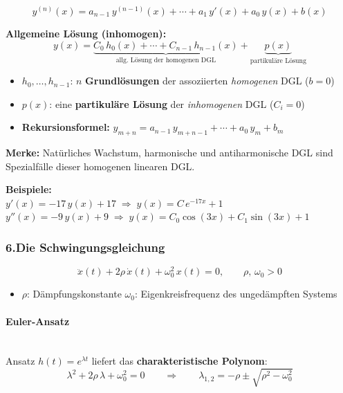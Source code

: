 \documentclass[../../zusammenfassung_AN.tex]{subfiles}
\begin{document}
	\[
	y^{(n)}(x) = a_{n-1}\,y^{(n-1)}(x) + \cdots + a_1\,y'(x) + a_0\,y(x) + b(x)
	\]
	
	\begin{tcolorbox}[formelbox]
		\textbf{Allgemeine Lösung (inhomogen):}
		\[
		\boxed{y(x) = \underbrace{C_0\,h_0(x) + \cdots + C_{n-1}\,h_{n-1}(x)}_{\text{allg.\ Lösung der homogenen DGL}} + \underbrace{p(x)}_{\text{partikuläre Lösung}}}
		\]
	\end{tcolorbox}
	
	\begin{itemize}[noitemsep, topsep=2pt]
		\item $h_0,\dots,h_{n-1}$: $n$ \textbf{Grundlösungen} der assoziierten \emph{homogenen} DGL ($b=0$)
		\item $p(x)$: eine \textbf{partikuläre Lösung} der \emph{inhomogenen} DGL ($C_i=0$)
		\item \textbf{Rekursionsformel:} $y_{m+n} = a_{n-1}\,y_{m+n-1} + \cdots + a_0\,y_m + b_m$
	\end{itemize}
	
	\begin{tcolorbox}[hinweis]
		\textbf{Merke:} Natürliches Wachstum, harmonische und antiharmonische DGL sind
		Spezialfälle dieser homogenen linearen DGL.
	\end{tcolorbox}
	
	\textbf{Beispiele:}\\
	$y'(x)=-17\,y(x)+17 \;\Rightarrow\; y(x)=C\,e^{-17x}+1$\\
	$y''(x)=-9\,y(x)+9 \;\Rightarrow\; y(x)=C_0\cos(3x)+C_1\sin(3x)+1$
	
	\vspace{0.8em}
	
	\subsubsection*{\color{mainblue}6.\quad Die Schwingungsgleichung}
	
	\[
	\ddot{x}(t) + 2\rho\,\dot{x}(t) + \omega_0^2\,x(t) = 0,
	\qquad \rho,\,\omega_0 > 0
	\]
	
	\begin{itemize}[noitemsep, topsep=2pt]
		\item $\rho$: Dämpfungskonstante \qquad $\omega_0$: Eigenkreisfrequenz des ungedämpften Systems
	\end{itemize}
	
	\paragraph*{Euler-Ansatz}\mbox{}\\
	Ansatz $h(t)=e^{\lambda t}$ liefert das \textbf{charakteristische Polynom}:
	\[
	\lambda^2 + 2\rho\,\lambda + \omega_0^2 = 0
	\qquad\Rightarrow\qquad
	\lambda_{1,2} = -\rho \pm \sqrt{\rho^2 - \omega_0^2}
	\]
	
\end{document}

